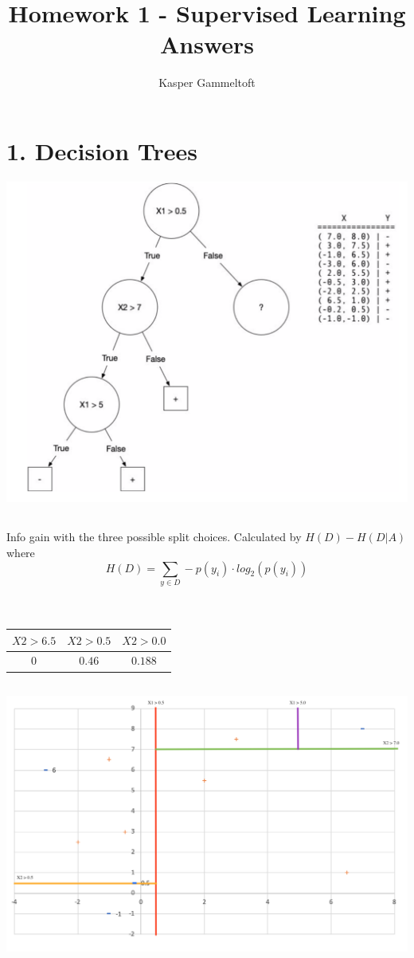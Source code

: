 \documentclass[12pt, oneside]{article}   	%
\title{Homework 1 - Supervised Learning Answers}
\author{Kasper Gammeltoft}
\begin{document}
\maketitle

\section{1. Decision Trees}

\includegraphics[scale=0.8]{decision_tree}

\subsection{}
Info gain with the three possible split choices.  Calculated by $H(D) - H(D|A)$ where\\ 
$$H(D) = \sum_{y\in D} -p(y_i) \cdot log_2(p(y_i))$$\\ \\
\begin{tabular}{c | c | c}
	$X2 > 6.5$ & $X2 > 0.5$ & $X2 > 0.0$ \\
	\hline
	$0$ & $0.46$ & $0.188$ \\
\end{tabular}

\subsection{}

\includegraphics[scale=0.8]{decisionboundaryplot}
\end{document}
